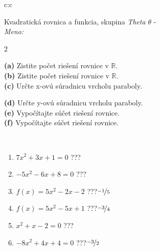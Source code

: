\documentclass[10pt]{report}
\begin{document}
\begin{tabular}{c:c}
\begin{minipage}[c][104.5mm][t]{0.5\linewidth}
\begin{center}
\vspace{7mm}
{\huge {\LARGE Kvadratická rovnica a funkcia}, skupina \textit{Theta $\theta$} -}\\[5mm]
\textit{Meno:}\phantom{xxxxxxxxxxxxxxxxxxxxxxxxxxxxxxxxxxxxxxxxxxxxxxxxxxxxxxxxxxxxxxxxx}\\[5mm]
\begin{minipage}{0.95\linewidth}
\begin{center}
{\small \begin{multicols}{2} \raggedright
\textbf{(a)} Zistite počet riešení rovnice v \(\mathbb{R}\). \\[1mm]
\textbf{(b)} Zistite počet riešení rovnice v \(\mathbb{R}\). \\[1mm]
\textbf{(c)} Určte x-ovú súradnicu vrcholu paraboly. \par \columnbreak
\textbf{(d)} Určte y-ovú súradnicu vrcholu paraboly. \\[1mm]
\textbf{(e)} Vypočítajte súčet riešení rovnice. \\[1mm]
\textbf{(f)} Vypočítajte súčet riešení rovnice.
\end{multicols}
}
\end{center}
\end{minipage}
\\[4mm]
\begin{minipage}{0.79\linewidth}
\begin{center}
\begin{varwidth}{\linewidth}
\begin{enumerate}
\Large
\item $7x^2+3x+1=0$\quad \dotfill\; ???\;\dotfill {}
\item $-5x^2-6x+8=0$\quad \dotfill\; ???\;\dotfill {}
\item $f(x)=5x^2-2x-2$\quad \dotfill\; ???\;\dotfill \quad $\nicefrac{-1}{5}$
\item $f(x)=5x^2-5x+1$\quad \dotfill\; ???\;\dotfill \quad $\nicefrac{-3}{4}$
\item $x^2+x-2=0$\quad \dotfill\; ???\;\dotfill {}
\item $-8x^2+4x+4=0$\quad \dotfill\; ???\;\dotfill \quad $\nicefrac{-3}{2}$
\end{enumerate}
\end{varwidth}
\end{center}

\end{minipage}
\end{center}
\end{minipage}
\end{tabular}
\end{document}
